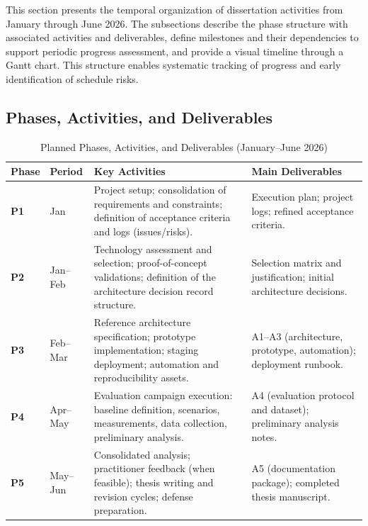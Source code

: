 This section presents the temporal organization of dissertation activities from January through June 2026. The subsections describe the phase structure with associated activities and deliverables, define milestones and their dependencies to support periodic progress assessment, and provide a visual timeline through a Gantt chart. This structure enables systematic tracking of progress and early identification of schedule risks.

\subsection{Phases, Activities, and Deliverables}

\begin{table}[htbp]
\centering
\caption{Planned Phases, Activities, and Deliverables (January--June 2026)}
\label{tab:phases}
\footnotesize
\begin{tabular}{@{}p{}p{}p{}p{}@{}}
		\toprule
		\textbf{Phase} & \textbf{Period} & \textbf{Key Activities} & \textbf{Main Deliverables} \\
\midrule
		\textbf{P1} & Jan &
Project setup; consolidation of requirements and constraints; definition of acceptance criteria and logs (issues/risks). &
Execution plan; project logs; refined acceptance criteria. \\
\addlinespace
		\textbf{P2} & Jan--Feb &
Technology assessment and selection; proof-of-concept validations; definition of the architecture decision record structure. &
Selection matrix and justification; initial architecture decisions. \\
\addlinespace
		\textbf{P3} & Feb--Mar &
Reference architecture specification; prototype implementation; staging deployment; automation and reproducibility assets. &
A1--A3 (architecture, prototype, automation); deployment runbook. \\
\addlinespace
		\textbf{P4} & Apr--May &
Evaluation campaign execution: baseline definition, scenarios, measurements, data collection, preliminary analysis. &
A4 (evaluation protocol and dataset); preliminary analysis notes. \\
\addlinespace
		\textbf{P5} & May--Jun &
Consolidated analysis; practitioner feedback (when feasible); thesis writing and revision cycles; defense preparation. &
A5 (documentation package); completed thesis manuscript. \\
\bottomrule
\end{tabular}
\end{table}

